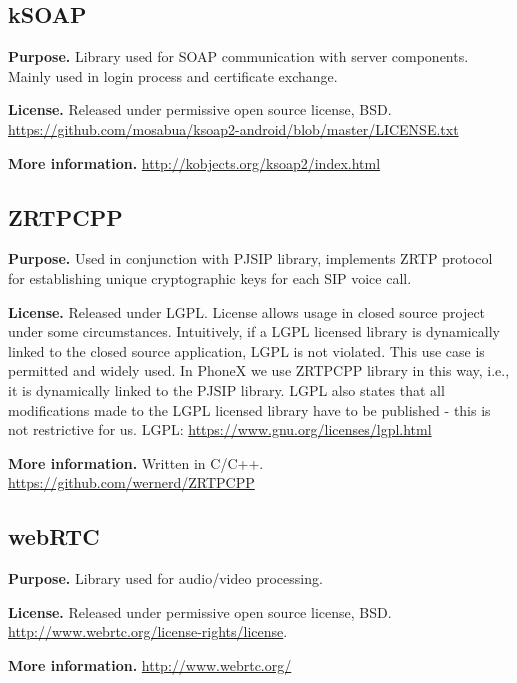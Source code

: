 \documentclass[a4paper,10pt]{article}
\begin{document}
\subsection{kSOAP}
\par\smallskip\noindent\textbf{Purpose.} Library used for SOAP communication with server components. Mainly used in login process and certificate exchange.
\par\smallskip\noindent\textbf{License.} Released under permissive open source license, BSD. \\ \url{https://github.com/mosabua/ksoap2-android/blob/master/LICENSE.txt}
\par\smallskip\noindent\textbf{More information.}  \url{http://kobjects.org/ksoap2/index.html}

\subsection{ZRTPCPP}\label{sec:zrtpcpp}
\par\smallskip\noindent\textbf{Purpose.} Used in conjunction with PJSIP library, implements ZRTP protocol for establishing unique cryptographic keys 
for each SIP voice call.
\par\smallskip\noindent\textbf{License.} Released under LGPL. License allows usage in closed source project under some circumstances. Intuitively, if a LGPL
licensed library is dynamically linked to the closed source application, LGPL is not violated. This use case is permitted and widely used. In PhoneX
we use ZRTPCPP library in this way, i.e., it is dynamically linked to the PJSIP library. LGPL also states that all modifications made to the LGPL licensed 
library have to be published - this is not restrictive for us. LGPL: \url{https://www.gnu.org/licenses/lgpl.html}
\par\smallskip\noindent\textbf{More information.} Written in C/C++. \\ \url{https://github.com/wernerd/ZRTPCPP}

\subsection{webRTC}
\par\smallskip\noindent\textbf{Purpose.} Library used for audio/video processing.
\par\smallskip\noindent\textbf{License.} Released under permissive open source license, BSD. \\ \url{http://www.webrtc.org/license-rights/license}.
\par\smallskip\noindent\textbf{More information.}  \url{http://www.webrtc.org/}
\end{document}
